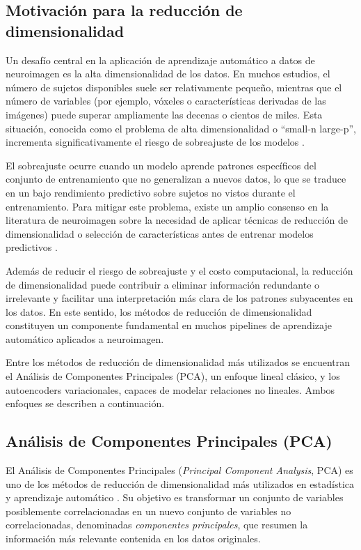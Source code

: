 \subsection{Motivación para la reducción de dimensionalidad}
Un desafío central en la aplicación de aprendizaje automático a datos de neuroimagen es la alta dimensionalidad de los datos. En muchos estudios, el número de sujetos disponibles suele ser relativamente pequeño, mientras que el número de variables (por ejemplo, vóxeles o características derivadas de las imágenes) puede superar ampliamente las decenas o cientos de miles. Esta situación, conocida como el problema de alta dimensionalidad o ``small-n large-p'', incrementa significativamente el riesgo de sobreajuste de los modelos \cite{mwangi2014review}.

El sobreajuste ocurre cuando un modelo aprende patrones específicos del conjunto de entrenamiento que no generalizan a nuevos datos, lo que se traduce en un bajo rendimiento predictivo sobre sujetos no vistos durante el entrenamiento. Para mitigar este problema, existe un amplio consenso en la literatura de neuroimagen sobre la necesidad de aplicar técnicas de reducción de dimensionalidad o selección de características antes de entrenar modelos predictivos \cite{mwangi2014review}.

Además de reducir el riesgo de sobreajuste y el costo computacional, la reducción de dimensionalidad puede contribuir a eliminar información redundante o irrelevante y facilitar una interpretación más clara de los patrones subyacentes en los datos. En este sentido, los métodos de reducción de dimensionalidad constituyen un componente fundamental en muchos pipelines de aprendizaje automático aplicados a neuroimagen.

Entre los métodos de reducción de dimensionalidad más utilizados se encuentran el Análisis de Componentes Principales (PCA), un enfoque lineal clásico, y los autoencoders variacionales, capaces de modelar relaciones no lineales. Ambos enfoques se describen a continuación.


\subsection{Análisis de Componentes Principales (PCA)}
\label{sec:pca}

El Análisis de Componentes Principales (\textit{Principal Component Analysis}, PCA) es uno de los métodos de reducción de dimensionalidad más utilizados en estadística y aprendizaje automático \cite{jolliffe2002pca}. Su objetivo es transformar un conjunto de variables posiblemente correlacionadas en un nuevo conjunto de variables no correlacionadas, denominadas \textit{componentes principales}, que resumen la información más relevante contenida en los datos originales.

